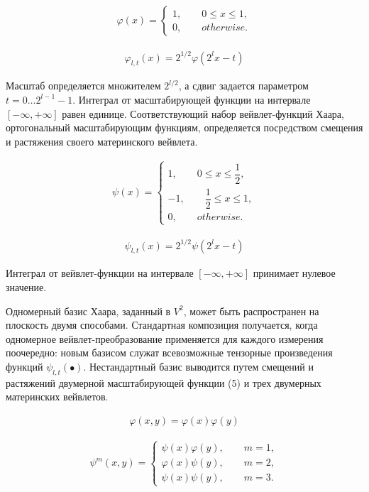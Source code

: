 \begin{gather}
\varphi(x) =
  \begin{cases}
    1,\qquad 0\le x \le 1,\\
    0,\qquad otherwise.
 \end{cases}
\end{gather}

\begin{gather}
\varphi_{l,t}(x) = 2^{1/2}\varphi(2^lx-t)
\end{gather} 

Масштаб определяется множителем $2^{l/2}$, а сдвиг задается параметром $t = 0 \ldots{} 2^{l-1} - 1$. Интеграл от масштабирующей функции на интервале $[-\infty, +\infty]$ равен единице. Соответствующий набор вейвлет-функций Хаара, ортогональный масштабирующим функциям, определяется посредством смещения и растяжения своего материнского вейвлета.

\begin{gather}
\psi(x) =
  \begin{cases}
    1,\qquad 0\le x \le \dfrac{1}{2},\\
    -1,\qquad \dfrac{1}{2}\le x \le 1,\\
    0,\qquad otherwise.
 \end{cases}
\end{gather}

\begin{gather}
\psi_{l,t}(x) = 2^{1/2}\psi(2^lx-t)
\end{gather} 

Интеграл от вейвлет-функции на интервале $[-\infty, +\infty]$ принимает нулевое значение.

Одномерный базис Хаара, заданный в $V^2$, может быть распространен на плоскость двумя способами. Стандартная композиция получается, когда одномерное вейвлет-преобразование применяется для каждого измерения поочередно: новым базисом служат всевозможные тензорные произведения функций $\psi_{l,t}(\bullet)$. Нестандартный базис выводится путем смещений и растяжений двумерной масштабирующей функции (5) и трех двумерных материнских вейвлетов.

\begin{gather}
\varphi(x,y)=\varphi(x)\varphi(y)
\end{gather}

\begin{gather}
\psi^m(x,y) =
  \begin{cases}
    \psi(x)\varphi(y),\qquad m=1,\\
    \varphi(x)\psi(y),\qquad m=2,\\
    \psi(x)\psi(y),\qquad m=3.
 \end{cases}
\end{gather}

